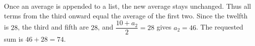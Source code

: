 Once an average is appended to a list, the new average stays unchanged. Thus all terms from the third onward equal the average of the first two. Since the twelfth is $28$, the third and fifth are $28$, and $\dfrac{10+a_2}{2}=28$ gives $a_2=46$. The requested sum is $46+28=\boxed{74}$.
